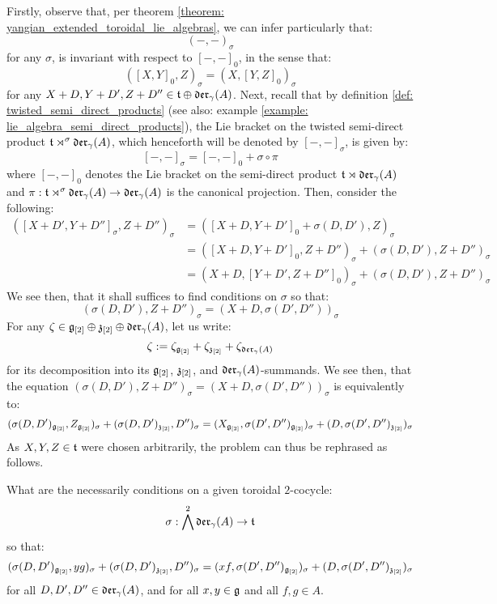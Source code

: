         Firstly, observe that, per theorem \ref{theorem: yangian_extended_toroidal_lie_algebras}, we can infer particularly that:
            $$(-, -)_{\sigma}$$
        for any $\sigma$, is invariant with respect to $[-, -]_0$, in the sense that:
            $$([X, Y]_0, Z)_{\sigma} = (X, [Y, Z]_0)_{\sigma}$$
        for any $X + D, Y + D', Z + D'' \in \mathfrak{t} \oplus \mathfrak{der}_{\gamma}(A)$. Next, recall that by definition \ref{def: twisted_semi_direct_products} (see also: example \ref{example: lie_algebra_semi_direct_products}), the Lie bracket on the twisted semi-direct product $\mathfrak{t} \rtimes^{\sigma} \mathfrak{der}_{\gamma}(A)$, which henceforth will be denoted by $[-, -]_{\sigma}$, is given by:
            $$[-, -]_{\sigma} = [-, -]_0 + \sigma \circ \pi$$
        where $[-, -]_0$ denotes the Lie bracket on the semi-direct product $\mathfrak{t} \rtimes \mathfrak{der}_{\gamma}(A)$ and $\pi: \mathfrak{t} \rtimes^{\sigma} \mathfrak{der}_{\gamma}(A) \to \mathfrak{der}_{\gamma}(A)$ is the canonical projection. Then, consider the following:
            $$
                \begin{aligned}
                    ([X + D', Y + D'']_{\sigma}, Z + D'')_{\sigma} & = ([X + D, Y + D']_0 + \sigma(D, D'), Z)_{\sigma}
                    \\
                    & = ([X + D, Y + D']_0, Z + D'')_{\sigma} + (\sigma(D, D'), Z + D'')_{\sigma}
                    \\
                    & = (X + D, [Y + D', Z + D'']_0)_{\sigma} + (\sigma(D, D'), Z + D'')_{\sigma}
                \end{aligned}
            $$
        We see then, that it shall suffices to find conditions on $\sigma$ so that:
            $$(\sigma(D, D'), Z + D'')_{\sigma} = (X + D, \sigma(D', D''))_{\sigma}$$
        For any $\zeta \in \mathfrak{g}_{[2]} \oplus \mathfrak{z}_{[2]} \oplus \mathfrak{der}_{\gamma}(A)$, let us write:
            $$\zeta := \zeta_{\mathfrak{g}_{[2]}} + \zeta_{\mathfrak{z}_{[2]}} + \zeta_{\mathfrak{der}_{\gamma}(A)}$$
        for its decomposition into its $\mathfrak{g}_{[2]}$, $\mathfrak{z}_{[2]}$, and $\mathfrak{der}_{\gamma}(A)$-summands. We see then, that the equation $(\sigma(D, D'), Z + D'')_{\sigma} = (X + D, \sigma(D', D''))_{\sigma}$ is equivalently to:
            $$(\sigma(D, D')_{\mathfrak{g}_{[2]}}, Z_{\mathfrak{g}_{[2]}})_{\sigma} + (\sigma(D, D')_{\mathfrak{z}_{[2]}}, D'')_{\sigma} = (X_{\mathfrak{g}_{[2]}}, \sigma(D', D'')_{\mathfrak{g}_{[2]}})_{\sigma} + (D, \sigma(D', D'')_{\mathfrak{z}_{[2]}})_{\sigma}$$
        As $X, Y, Z \in \mathfrak{t}$ were chosen arbitrarily, the problem can thus be rephrased as follows.
        \begin{question}
            What are the necessarily conditions on a given toroidal $2$-cocycle:
                $$\sigma: \bigwedge^2 \mathfrak{der}_{\gamma}(A) \to \mathfrak{t}$$
            so that:
                $$(\sigma(D, D')_{\mathfrak{g}_{[2]}}, yg)_{\sigma} + (\sigma(D, D')_{\mathfrak{z}_{[2]}}, D'')_{\sigma} = (xf, \sigma(D', D'')_{\mathfrak{g}_{[2]}})_{\sigma} + (D, \sigma(D', D'')_{\mathfrak{z}_{[2]}})_{\sigma}$$
            for all $D, D', D'' \in \mathfrak{der}_{\gamma}(A)$, and for all $x, y \in \mathfrak{g}$ and all $f, g \in A$.
        \end{question}
